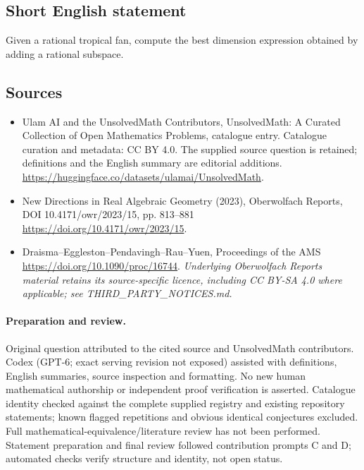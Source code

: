 \documentclass[11pt]{article}
\begin{document}
\subsection{Short English statement}
Given a rational tropical fan, compute the best dimension expression obtained by adding a rational subspace.
\subsection{Sources}
\begin{itemize}
\item[\hypertarget{source:statement:1}{S1}] Ulam AI and the UnsolvedMath Contributors, UnsolvedMath: A Curated Collection of Open Mathematics Problems, catalogue entry. Catalogue curation and metadata: CC BY 4.0. The supplied source question is retained; definitions and the English summary are editorial additions.
\url{https://huggingface.co/datasets/ulamai/UnsolvedMath}.
\item[\hypertarget{source:statement:2}{S2}] New Directions in Real Algebraic Geometry (2023), Oberwolfach Reports, DOI 10.4171/owr/2023/15, pp. 813--881
\url{https://doi.org/10.4171/owr/2023/15}.
\item[\hypertarget{source:statement:3}{S3}] Draisma--Eggleston--Pendavingh--Rau--Yuen, Proceedings of the AMS
\url{https://doi.org/10.1090/proc/16744}.
\textit{Underlying Oberwolfach Reports material retains its source-specific licence, including CC BY-SA 4.0 where applicable; see THIRD\_PARTY\_NOTICES.md.}
\end{itemize}
\paragraph{Preparation and review.}
Original question attributed to the cited source and UnsolvedMath contributors. Codex (GPT-6; exact serving revision not exposed) assisted with definitions, English summaries, source inspection and formatting. No new human mathematical authorship or independent proof verification is asserted. Catalogue identity checked against the complete supplied registry and existing repository statements; known flagged repetitions and obvious identical conjectures excluded. Full mathematical-equivalence/literature review has not been performed. Statement preparation and final review followed contribution prompts C and D; automated checks verify structure and identity, not open status.
\label{end:statement}
\end{document}

